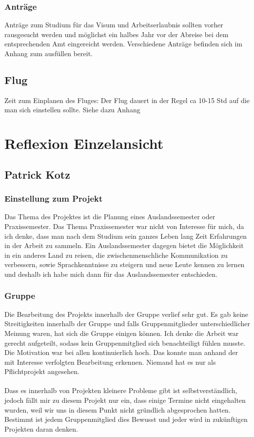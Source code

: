 \documentclass[11pt]{article}
\begin{document}
\subsubsection{Anträge}
Anträge zum Studium für das Visum und Arbeitserlaubnis sollten vorher rausgesucht werden und möglichst ein halbes Jahr vor der Abreise bei dem entsprechenden Amt eingereicht werden. Verschiedene Anträge befinden sich im Anhang zum ausfüllen bereit.

\subsection{Flug}
Zeit zum Einplanen des Fluges: Der Flug dauert in der Regel ca 10-15 Std auf die man sich einstellen sollte.
Siehe dazu Anhang

\section{Reflexion Einzelansicht}
\subsection{Patrick Kotz}
\subsubsection{Einstellung zum Projekt}

Das Thema des Projektes ist die Planung eines Auslandssemester oder Praxissemester. Das Thema Praxissemester war nicht von Interesse für mich, da ich denke, dass man nach dem Studium sein ganzes Leben lang Zeit Erfahrungen in der Arbeit zu sammeln. Ein Auslandssemester dagegen bietet die Möglichkeit in ein anderes Land zu reisen, die zwischenmenschliche  Kommunikation zu verbessern, sowie Sprachkenntnisse zu steigern und neue Leute kennen zu lernen und deshalb ich habe mich dann für das Auslandssemester entschieden. 



\subsubsection{Gruppe}

Die Bearbeitung des Projekts innerhalb der Gruppe verlief sehr gut. Es gab keine Streitigkeiten innerhalb der Gruppe und falls Gruppenmitglieder unterschiedlicher Meinung waren, hat sich die Gruppe einigen können. Ich denke die Arbeit war gerecht aufgeteilt, sodass kein Gruppenmitglied sich benachteiligt fühlen musste. Die Motivation war bei allen kontinuierlich hoch. Das konnte man anhand der mit Interesse verfolgten Bearbeitung erkennen. Niemand hat es nur als Pflichtprojekt angesehen.\\\\
Dass es innerhalb von Projekten kleinere Probleme gibt ist selbstverständlich, jedoch fällt mir zu diesem Projekt nur ein, dass einige Termine nicht eingehalten wurden, weil wir uns in diesem Punkt nicht gründlich abgesprochen hatten. Bestimmt ist jedem Gruppenmitglied dies Bewusst und jeder wird in zukünftigen Projekten daran denken.
\end{document}
